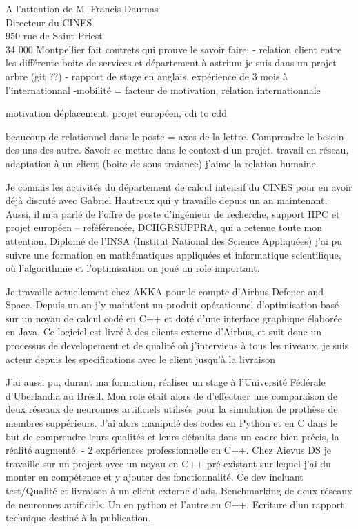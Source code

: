 \documentclass[12pt]{lettre}
\begin{document}
\begin{letter}{A l'attention de M. Francis Daumas\\Directeur du CINES\\950 rue de Saint Priest\\34 000 Montpellier}
fait contrets qui prouve le savoir faire:
- relation client entre les différente boite de services et département à astrium
je suis dans un projet arbre (git ??)
- rapport de stage en anglais, expérience de 3 mois à l'internationnal
-mobilité = facteur de motivation,  relation internationnale

motivation
déplacement, projet européen, cdi to cdd



beaucoup de relationnel dans le poste = axes de la lettre. Comprendre le besoin des uns des autre. Savoir se mettre dans le context d'un projet.
travail en réseau, adaptation à un client (boite de sous traiance) j'aime la relation humaine.

\newpage


{
Je connais les activités du département de calcul intensif du CINES pour en
avoir déjà discuté avec Gabriel Hautreux qui y travaille depuis un an
maintenant.
Aussi, il m'a parlé de l'offre de poste d'ingénieur de recherche,
support HPC et projet européen -- reféférencée, DCIIGRSUPPRA,
qui a retenue toute mon attention.
Diplomé de l'INSA (Institut National des Science Appliquées) j'ai pu suivre
une formation en mathématiques appliquées et informatique scientifique, où
l'algorithmie et l'optimisation on joué un role important. %
}

{
Je travaille
actuellement chez AKKA pour le compte d'Airbus Defence and Space.
Depuis un an j'y maintient un produit opérationnel d'optimisation
basé sur un noyau de calcul codé en C++ et doté d'une interface graphique élaborée en Java.
Ce logiciel est livré à des clients externe d'Airbus, et suit donc un
processus de developement et de qualité où
j'interviens à tous les niveaux.
je suis acteur depuis les specifications avec le client jusqu'à la livraison

J'ai aussi pu, durant ma formation, réaliser un stage à l'Université Fédérale d'Uberlandia au Brésil.
Mon role était alors de d'effectuer une comparaison de deux réseaux de neuronnes artificiels utilisés pour la simulation de prothèse de membres suppérieurs.
J'ai alors manipulé des codes en Python et en C dans le but de comprendre leurs qualités et leurs défaults dans un cadre bien précis, la réalité augmenté.
 - 2 expériences professionnelle en C++.
 Chez Aievus DS je travaille sur un project avec un noyau en C++ pré-existant sur lequel j'ai du monter en compétence et y ajouter des fonctionnalité. Ce dev incluant test/Qualité et livraison à un client externe d'ads.
 Benchmarking de deux réseaux de neuronnes artificiels. Un en python et l'autre en C++. Ecriture d'un rapport technique destiné à la publication.

}
\end{letter}
\end{document}

